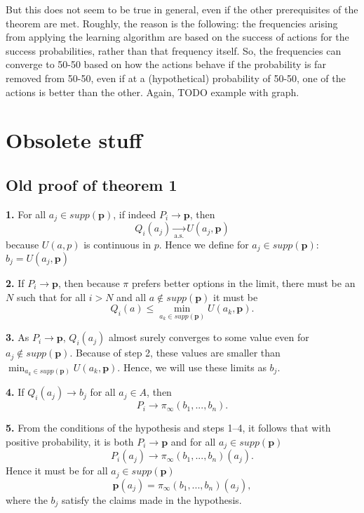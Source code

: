 \documentclass{article}
\begin{document}
But this does not seem to be true in general, even if the other prerequisites of the theorem are met. Roughly, the reason is the following: the frequencies arising from applying the learning algorithm are based on the success of actions for the success probabilities, rather than that frequency itself. So, the frequencies can converge to 50-50 based on how the actions behave if the probability is far removed from 50-50, even if at a (hypothetical) probability of 50-50, one of the actions is better than the other. Again, TODO example with graph.

\section*{Obsolete stuff}

\subsection*{Old proof of theorem 1}

\textbf{1.} For all $a_j\in supp (\mathbf{p})$, if indeed $P_i\rightarrow \mathbf{p}$, then 
\begin{equation}\label{eq:proof-part-one-main-eq}
Q_i(a_j)\underset{\text{a.s.}}{\rightarrow} U(a_j,\mathbf{p})
\end{equation}
because $U(a,p)$ is continuous in $p$. Hence we define for $a_j\in supp (\mathbf{p})$: $b_j=U(a_j,\mathbf{p})$

\textbf{2.} If $P_i\rightarrow \mathbf{p}$, then because $\pi$ prefers better options in the limit, there must be an $N$ such that for all $i>N$ and all $a\notin supp (\mathbf{p})$ it must be
\begin{equation}\label{eq:proof-part-two-main-eq}
Q_i(a)\leq \min_{a_k\in supp (\mathbf{p}) } U(a_k,\mathbf{p}).
\end{equation}

\textbf{3.} As $P_i \rightarrow \mathbf{p}$, $Q_i(a_j)$ almost surely converges to some value even for $a_j\notin supp(\mathbf{p})$. Because of step 2, these values are smaller than $\min_{a_k\in supp (\mathbf{p}) } U(a_k,\mathbf{p})$. Hence, we will use these limits as $b_j$.

\textbf{4.} If $Q_i(a_j)\rightarrow b_j$ for all $a_j\in A$, then
\begin{equation}\label{eq:proof-part-four-main-eq}
P_i \rightarrow \pi_\infty (b_1,...,b_n).
\end{equation}

\textbf{5.} From the conditions of the hypothesis and steps 1--4, it follows that with positive probability, it is both $P_i\rightarrow \mathbf{p}$ and for all $a_j\in supp(\mathbf{p})$
\begin{equation}\label{eq:proof-part-five-main-eq}
P_i(a_j) \rightarrow \pi_\infty  (b_1,...,b_n)(a_j).
\end{equation}
Hence it must be for all $a_j\in supp(\mathbf{p})$
\begin{equation}
\mathbf{p}(a_j)=\pi_\infty (b_1,...,b_n)(a_j),
\end{equation}
where the $b_j$ satisfy the claims made in the hypothesis.
\end{document}
